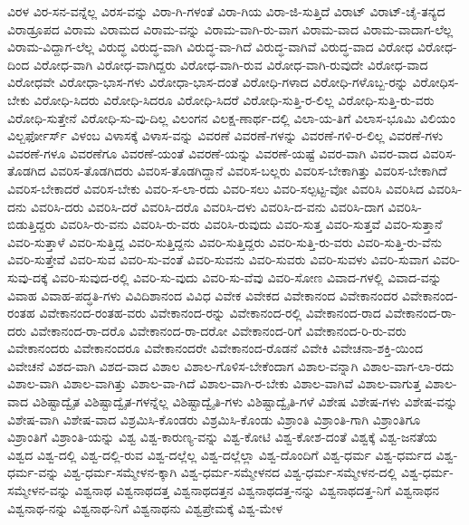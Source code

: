 {ವಿರಳ
ವಿರ-ಸನ-ವನ್ನೆಲ್ಲ
ವಿರಸ-ವನ್ನು
ವಿರಾ-ಗಿ-ಗಳಂತೆ
ವಿರಾ-ಗಿಯ
ವಿರಾ-ಜಿ-ಸುತ್ತಿದೆ
ವಿರಾಟ್
ವಿರಾಟ್-ಚೈ-ತನ್ಯದ
ವಿರಾಡ್ರೂಪದ
ವಿರಾಮ
ವಿರಾಮದ
ವಿರಾಮ-ವನ್ನು
ವಿರಾಮ-ವಾಗಿ-ರು-ವಾಗ
ವಿರಾಮ-ವಾದ
ವಿರಾಮ-ವಾದಾಗ-ಲೆಲ್ಲ
ವಿರಾಮ-ವಿದ್ದಾಗ-ಲೆಲ್ಲ
ವಿರುದ್ಧ
ವಿರುದ್ಧ-ವಾಗಿ
ವಿರುದ್ಧ-ವಾ-ಗಿದೆ
ವಿರುದ್ಧ-ವಾಗಿವೆ
ವಿರುದ್ಧ-ವಾದ
ವಿರೋಧ
ವಿರೋಧ-ದಿಂದ
ವಿರೋಧ-ವಾಗಿ
ವಿರೋಧ-ವಾಗಿದ್ದರು
ವಿರೋಧ-ವಾಗಿ-ರುವ
ವಿರೋಧ-ವಾಗಿ-ರುವುದೇ
ವಿರೋಧ-ವಾದ
ವಿರೋಧವೇ
ವಿರೋಧಾ-ಭಾಸ-ಗಳು
ವಿರೋಧಾ-ಭಾಸ-ದಂತೆ
ವಿರೋಧಿ-ಗಳಾದ
ವಿರೋಧಿ-ಗಳೊಬ್ಬ-ರನ್ನು
ವಿರೋಧಿಸ-ಬೇಕು
ವಿರೋಧಿ-ಸಿದರು
ವಿರೋಧಿ-ಸಿದರೂ
ವಿರೋಧಿ-ಸಿದರೆ
ವಿರೋಧಿ-ಸುತ್ತಿ-ರ-ಲಿಲ್ಲ
ವಿರೋಧಿ-ಸುತ್ತಿ-ರು-ವರು
ವಿರೋಧಿ-ಸುತ್ತೇನೆ
ವಿರೋಧಿ-ಸು-ವು-ದಿಲ್ಲ
ವಿಲಂಗನ
ವಿಲಕ್ಷ-ಣಾರ್ಥ-ದಲ್ಲಿ
ವಿಲಾ-ಯ-ತಿಗೆ
ವಿಲಾಸ-ಭೂಮಿ
ವಿಲಿಯಂ
ವಿಲ್ಬರ್ಫೋರ್ಸ್
ವಿಳಂಬ
ವಿಳಾಸಕ್ಕೆ
ವಿಳಾಸ-ವನ್ನು
ವಿವರಣೆ
ವಿವರಣೆ-ಗಳನ್ನು
ವಿವರಣೆ-ಗಳಿ-ರ-ಲಿಲ್ಲ
ವಿವರಣೆ-ಗಳು
ವಿವರಣೆ-ಗಳೂ
ವಿವರಣೆಗೂ
ವಿವರಣೆ-ಯಂತೆ
ವಿವರಣೆ-ಯನ್ನು
ವಿವರಣೆ-ಯಷ್ಟೆ
ವಿವರ-ವಾಗಿ
ವಿವರ-ವಾದ
ವಿವರಿಸ-ತೊಡಗಿದ
ವಿವರಿಸ-ತೊಡಗಿದರು
ವಿವರಿಸ-ತೊಡಗಿದ್ದಾನೆ
ವಿವರಿಸ-ಬಲ್ಲರು
ವಿವರಿಸ-ಬೇಕಾಗಿತ್ತು
ವಿವರಿಸ-ಬೇಕಾಗಿದೆ
ವಿವರಿಸ-ಬೇಕಾದರೆ
ವಿವರಿಸ-ಬೇಕು
ವಿವರಿ-ಸ-ಲಾ-ರದು
ವಿವರಿ-ಸಲು
ವಿವರಿ-ಸಲ್ಪಟ್ಟ-ವೋ
ವಿವರಿಸಿ
ವಿವರಿಸಿದ
ವಿವರಿಸಿ-ದನು
ವಿವರಿಸಿ-ದರು
ವಿವರಿಸಿ-ದರೆ
ವಿವರಿಸಿ-ದರೊ
ವಿವರಿಸಿ-ದಳು
ವಿವರಿಸಿ-ದ-ವನು
ವಿವರಿಸಿ-ದಾಗ
ವಿವರಿಸಿ-ಬಿಡುತ್ತಿದ್ದರು
ವಿವರಿಸಿ-ರು-ವನು
ವಿವರಿಸಿ-ರು-ವರು
ವಿವರಿಸಿ-ರುವುದು
ವಿವರಿ-ಸುತ್ತ
ವಿವರಿ-ಸುತ್ತವೆ
ವಿವರಿ-ಸುತ್ತಾನೆ
ವಿವರಿ-ಸುತ್ತಾಳೆ
ವಿವರಿ-ಸುತ್ತಿದ್ದ
ವಿವರಿ-ಸುತ್ತಿದ್ದನು
ವಿವರಿ-ಸುತ್ತಿದ್ದರು
ವಿವರಿ-ಸುತ್ತಿ-ರು-ವರು
ವಿವರಿ-ಸುತ್ತಿ-ರು-ವೆನು
ವಿವರಿ-ಸುತ್ತೇವೆ
ವಿವರಿ-ಸುವ
ವಿವರಿ-ಸು-ವಂತೆ
ವಿವರಿ-ಸುವನು
ವಿವರಿ-ಸುವರು
ವಿವರಿ-ಸುವಳು
ವಿವರಿ-ಸುವಾಗ
ವಿವರಿ-ಸುವು-ದಕ್ಕೆ
ವಿವರಿ-ಸುವುದ-ರಲ್ಲಿ
ವಿವರಿ-ಸು-ವುದು
ವಿವರಿ-ಸು-ವೆವು
ವಿವರಿ-ಸೋಣ
ವಿವಾದ-ಗಳಲ್ಲಿ
ವಿವಾದ-ವನ್ನು
ವಿವಾಹ
ವಿವಾಹ-ಪದ್ಧತಿ-ಗಳು
ವಿವಿದಿಶಾನಂದ
ವಿವಿಧ
ವಿವೇಕ
ವಿವೇಕದ
ವಿವೇಕಾನಂದ
ವಿವೇಕಾನಂದರ
ವಿವೇಕಾನಂದ-ರಂತಹ
ವಿವೇಕಾನಂದ-ರಂತಹ-ವರು
ವಿವೇಕಾನಂದ-ರನ್ನು
ವಿವೇಕಾನಂದ-ರಲ್ಲಿ
ವಿವೇಕಾನಂದ-ರಾದ
ವಿವೇಕಾನಂದ-ರಾ-ದರು
ವಿವೇಕಾನಂದ-ರಾ-ದರೊ
ವಿವೇಕಾನಂದ-ರಾ-ದರೋ
ವಿವೇಕಾನಂದ-ರಿಗೆ
ವಿವೇಕಾನಂದ-ರಿ-ರು-ವರು
ವಿವೇಕಾನಂದರು
ವಿವೇಕಾನಂದರೂ
ವಿವೇಕಾನಂದರೇ
ವಿವೇಕಾನಂದ-ರೊಡನೆ
ವಿವೇಕಿ
ವಿವೇಚನಾ-ಶಕ್ತಿ-ಯಿಂದ
ವಿವೇಚನೆ
ವಿಶದ-ವಾಗಿ
ವಿಶದ-ವಾದ
ವಿಶಾಲ
ವಿಶಾಲ-ಗೊಳಿಸ-ಬೇಕೆಂದಾಗ
ವಿಶಾಲ-ವನ್ನಾಗಿ
ವಿಶಾಲ-ವಾಗ-ಲಾ-ರದು
ವಿಶಾಲ-ವಾಗಿ
ವಿಶಾಲ-ವಾಗಿತ್ತು
ವಿಶಾಲ-ವಾ-ಗಿದೆ
ವಿಶಾಲ-ವಾಗಿ-ರ-ಬೇಕು
ವಿಶಾಲ-ವಾಗಿವೆ
ವಿಶಾಲ-ವಾಗುತ್ತ
ವಿಶಾಲ-ವಾದ
ವಿಶಿಷ್ಟಾದ್ವೈತ
ವಿಶಿಷ್ಟಾದ್ವೈತ-ಗಳನ್ನೆಲ್ಲ
ವಿಶಿಷ್ಟಾದ್ವೈತಿ-ಗಳು
ವಿಶಿಷ್ಟಾದ್ವೈತಿ-ಗಳೆ
ವಿಶೇಷ
ವಿಶೇಷ-ಗಳು
ವಿಶೇಷ-ವನ್ನು
ವಿಶೇಷ-ವಾಗಿ
ವಿಶೇಷ-ವಾದ
ವಿಶ್ರಮಿಸಿ-ಕೊಂಡರು
ವಿಶ್ರಮಿಸಿ-ಕೊಂಡು
ವಿಶ್ರಾಂತಿ
ವಿಶ್ರಾಂತಿ-ಗಾಗಿ
ವಿಶ್ರಾಂತಿಗೂ
ವಿಶ್ರಾಂತಿಗೆ
ವಿಶ್ರಾಂತಿ-ಯನ್ನು
ವಿಶ್ವ
ವಿಶ್ವ-ಕಾರುಣ್ಯ-ವನ್ನು
ವಿಶ್ವ-ಕೋಟಿ
ವಿಶ್ವ-ಕೋಶ-ದಂತೆ
ವಿಶ್ವಕ್ಕೆ
ವಿಶ್ವ-ಜನತೆಯ
ವಿಶ್ವದ
ವಿಶ್ವ-ದಲ್ಲಿ
ವಿಶ್ವ-ದಲ್ಲಿ-ರುವ
ವಿಶ್ವ-ದಲ್ಲೆಲ್ಲ
ವಿಶ್ವ-ದಲ್ಲೆಲ್ಲಾ
ವಿಶ್ವ-ದೊಂದಿಗೆ
ವಿಶ್ವ-ಧರ್ಮ
ವಿಶ್ವ-ಧರ್ಮದ
ವಿಶ್ವ-ಧರ್ಮ-ವನ್ನು
ವಿಶ್ವ-ಧರ್ಮ-ಸಮ್ಮೇಳನ-ಕ್ಕಾಗಿ
ವಿಶ್ವ-ಧರ್ಮ-ಸಮ್ಮೇಳನದ
ವಿಶ್ವ-ಧರ್ಮ-ಸಮ್ಮೇಳನ-ದಲ್ಲಿ
ವಿಶ್ವ-ಧರ್ಮ-ಸಮ್ಮೇಳನ-ವನ್ನು
ವಿಶ್ವನಾಥ
ವಿಶ್ವನಾಥದತ್ತ
ವಿಶ್ವನಾಥದತ್ತನ
ವಿಶ್ವನಾಥದತ್ತ-ನನ್ನು
ವಿಶ್ವನಾಥದತ್ತ-ನಿಗೆ
ವಿಶ್ವನಾಥನ
ವಿಶ್ವನಾಥ-ನನ್ನು
ವಿಶ್ವನಾಥ-ನಿಗೆ
ವಿಶ್ವನಾಥನು
ವಿಶ್ವಪ್ರೇಮಕ್ಕೆ
ವಿಶ್ವ-ಮೇಳ
}
